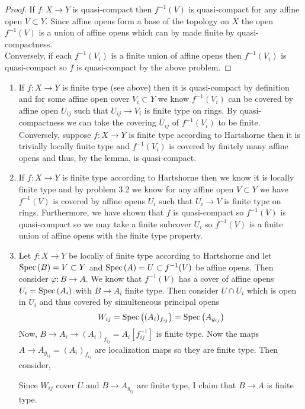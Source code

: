 \documentclass[12pt]{article}
\begin{document}
\begin{proof}
If $f : X \to Y$ is quasi-compact then $f^{-1}(V)$ is quasi-compact for any affine open $V \subset Y$. Since affine opens form a base of the topology on $X$ the open $f^{-1}(V)$ is a union of affine opens which can by made finite by quasi-compactness. 
\bigskip\\
Conversely, if each $f^{-1}(V_i)$ is a finite union of affine opens then $f^{-1}(V_i)$ is quasi-compact so $f$ is quasi-compact by the above problem.
\end{proof}

\begin{enumerate}
\item If $f : X \to Y$ is finite type (see above) then it is quasi-compact by definition and for some affine open cover $V_i \subset Y$ we know $f^{-1}(V_i)$ can be covered by affine open $U_{ij}$ such that $U_{ij} \to V_i$ is finite type on rings. By quasi-compactness we can take the covering $U_{ij}$ of $f^{-1}(V_i)$ to be finite. Conversely, suppose $f : X \to Y$ is finite type according to Hartshorne then it is trivially locally finite type and $f^{-1}(V_i)$ is covered by finitely many affine opens and thus, by the lemma, is quasi-compact. 

\item If $f : X \to Y$ is finite type according to Hartshorne then we know it is locally finite type and by problem 3.2 we know for any affine open $V \subset Y$ we have $f^{-1}(V)$ is covered by affine opens $U_{i}$ such that $U_{i} \to V$ is finite type on rings. Furthermore, we have shown that $f$ is quasi-compact so $f^{-1}(V)$ is quasi-compact so we may take a finite subcover $U_i$ so $f^{-1}(V)$ is a finite union of affine opens with the finite type property. 

\item Let $f : X \to Y$ be locally of finite type according to Hartshorne and let $\mathrm{Spec}\left( B \right) = V \subset Y$ and $\mathrm{Spec}\left( A \right) = U \subset f^{-1}(V)$ be affine opens. Then consider $\varphi : B \to A$. We know that $f^{-1}(V)$ has a cover of affine opens $U_i = \mathrm{Spec}\left( A_i \right)$ with $B \to A_i$ finite type. Then consider $U \cap U_i$ which is open in $U_i$ and thus covered by simulteneous principal opens
\[ W_{ij} = \mathrm{Spec}\left( (A_i)_{f_{ij}} \right) = \mathrm{Spec}\left( A_{g_{ij}} \right) \]
Now, $B \to A_i \to (A_i)_{f_{ij}} = A_i[f_{ij}^{-1}]$ is finite type. Now the maps $A \to A_{g_{ij}} = (A_i)_{f_{ij}}$ are localization maps so they are finite type. Then consider,
\begin{center}
\end{center} 
Since $W_{ij}$ cover $U$ and $B \to A_{g_{ij}}$ are finite type, I claim that $B \to A$ is finite type. 


\end{enumerate}
\end{document}

